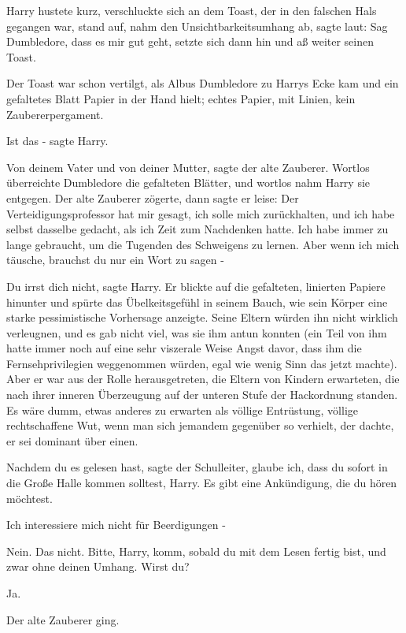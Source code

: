Harry hustete kurz, verschluckte sich an dem Toast, der in den falschen Hals
gegangen war, stand auf, nahm den Unsichtbarkeitsumhang ab, sagte laut: \glqq{}
Sag Dumbledore, dass es mir gut geht\grqq{}, setzte sich dann hin und aß weiter
seinen Toast.

Der Toast war schon vertilgt, als Albus Dumbledore zu Harrys Ecke kam und ein
gefaltetes Blatt Papier in der Hand hielt; echtes Papier, mit Linien, kein
Zaubererpergament.

\glqq{}Ist das -\grqq{} sagte Harry.

\glqq{}Von deinem Vater und von deiner Mutter\grqq{}, sagte der alte Zauberer.
Wortlos überreichte Dumbledore die gefalteten Blätter, und wortlos nahm Harry
sie entgegen. Der alte Zauberer zögerte, dann sagte er leise: \glqq{}Der
Verteidigungsprofessor hat mir gesagt, ich solle mich zurückhalten, und ich habe
selbst dasselbe gedacht, als ich Zeit zum Nachdenken hatte. Ich habe immer zu
lange gebraucht, um die Tugenden des Schweigens zu lernen. Aber wenn ich mich
täusche, brauchst du nur ein Wort zu sagen -\grqq{}

\glqq{}Du irrst dich nicht\grqq{}, sagte Harry. Er blickte auf die gefalteten,
linierten Papiere hinunter und spürte das Übelkeitsgefühl in seinem Bauch, wie
sein Körper eine starke pessimistische Vorhersage anzeigte. Seine Eltern würden
ihn nicht wirklich verleugnen, und es gab nicht viel, was sie ihm antun konnten
(ein Teil von ihm hatte immer noch auf eine sehr viszerale Weise Angst davor,
dass ihm die Fernsehprivilegien weggenommen würden, egal wie wenig Sinn das
jetzt machte). Aber er war aus der Rolle herausgetreten, die Eltern von Kindern
erwarteten, die nach ihrer inneren Überzeugung auf der unteren Stufe der
Hackordnung standen. Es wäre dumm, etwas anderes zu erwarten als völlige
Entrüstung, völlige rechtschaffene Wut, wenn man sich jemandem gegenüber so
verhielt, der dachte, er sei dominant über einen.

\glqq{}Nachdem du es gelesen hast\grqq{}, sagte der Schulleiter, \glqq{}glaube
ich, dass du sofort in die Große Halle kommen solltest, Harry. Es gibt eine
Ankündigung, die du hören möchtest.\grqq{}

\glqq{}Ich interessiere mich nicht für Beerdigungen -\grqq{}

\glqq{}Nein. Das nicht. Bitte, Harry, komm, sobald du mit dem Lesen fertig bist,
und zwar ohne deinen Umhang. Wirst du?\grqq{}

\glqq{}Ja.\grqq{}

Der alte Zauberer ging.

